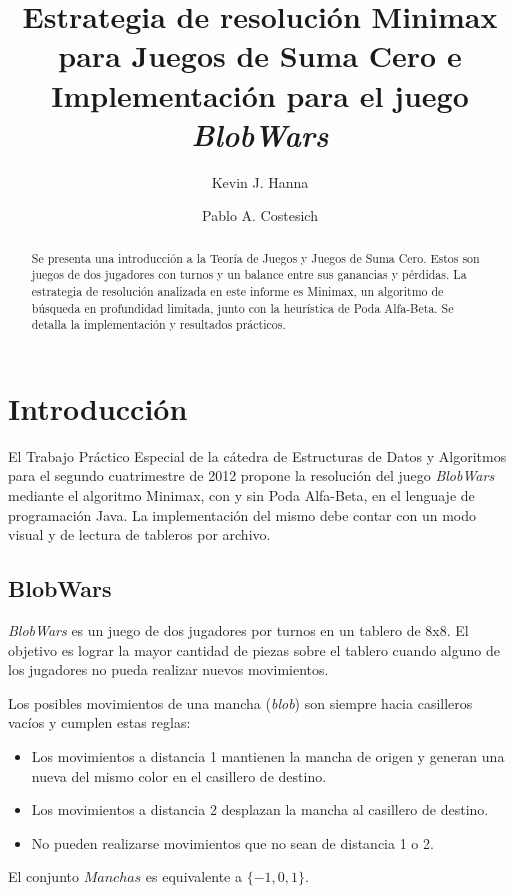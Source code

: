 \documentclass[10pt,a4paper,notitlepage]{article}
\author[1]{\rm Kevin J. Hanna}
\author[2]{\rm Pablo A. Costesich}
\affil[ ]{Alumnos de Ingeniería Informática}
\affil[ ]{Instituto Tecnológico de Buenos Aires}
\affil[ ]{Av. Madero 399, C.A.B.A., Argentina}
\affil[1]{\textit {khanna@alu.itba.edu.ar}}
\affil[2]{\textit {pcostesi@ieee.org}}
\title{Estrategia de resolución Minimax para Juegos de Suma Cero e Implementación para el juego \textit {BlobWars}}
\newenvironment{definition}[1][Definición]{\begin{trivlist}
\item[\hskip \labelsep {\bfseries #1}]}{\end{trivlist}}
\begin{document}
\maketitle
\begin{abstract}
Se presenta una introducción a la Teoría de Juegos y Juegos de Suma Cero. Estos son juegos de dos jugadores con turnos y un balance entre sus ganancias y pérdidas. La estrategia de resolución analizada en este informe es Minimax, un algoritmo de búsqueda en profundidad limitada, junto con la heurística de Poda Alfa-Beta. Se detalla la implementación y resultados prácticos.
\end{abstract}

\section{Introducción}
El Trabajo Práctico Especial de la cátedra de Estructuras de Datos y Algoritmos para el segundo cuatrimestre de 2012 propone la resolución del juego \textit{BlobWars} mediante el algoritmo Minimax, con y sin Poda Alfa-Beta, en el lenguaje de programación Java. La implementación del mismo debe contar con un modo visual y de lectura de tableros por archivo.


\subsection{BlobWars}
\textit{BlobWars} es un juego de dos jugadores por turnos en un tablero de 8x8. El objetivo es lograr la mayor cantidad de piezas sobre el tablero cuando alguno de los jugadores no pueda realizar nuevos movimientos.

Los posibles movimientos de una mancha (\textit{blob}) son siempre hacia casilleros vacíos y cumplen estas reglas:
\begin{itemize}
\item Los movimientos a distancia 1 mantienen la mancha de origen y generan una nueva del mismo color en el casillero de destino.
\item Los movimientos a distancia 2 desplazan la mancha al casillero de destino.
\item No pueden realizarse movimientos que no sean de distancia 1 o 2.
\end{itemize}

\begin{definition}
El conjunto $Manchas$ es equivalente a $\{-1, 0, 1\}$.
\end{definition}
\end{document}
